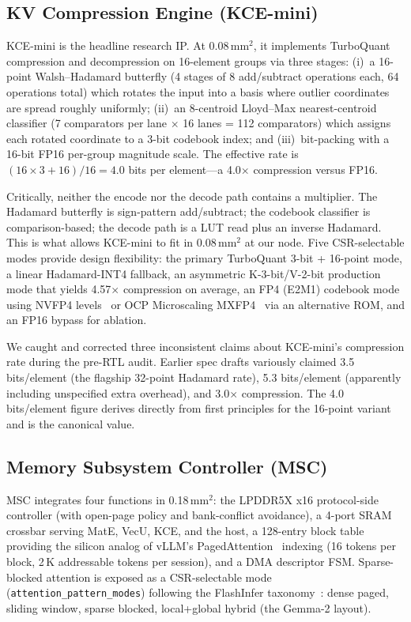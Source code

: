 \documentclass[conference]{IEEEtran}
\begin{document}
\subsection{KV Compression Engine (KCE-mini)}

KCE-mini is the headline research IP. At 0.08\,mm$^2$, it implements TurboQuant compression and decompression on 16-element groups via three stages: (i)\ a 16-point Walsh--Hadamard butterfly (4 stages of 8 add/subtract operations each, 64 operations total) which rotates the input into a basis where outlier coordinates are spread roughly uniformly; (ii)\ an 8-centroid Lloyd--Max nearest-centroid classifier (7 comparators per lane $\times$ 16 lanes = 112 comparators) which assigns each rotated coordinate to a 3-bit codebook index; and (iii)\ bit-packing with a 16-bit FP16 per-group magnitude scale. The effective rate is $(16 \times 3 + 16) / 16 = 4.0$ bits per element---a 4.0$\times$ compression versus FP16.

Critically, neither the encode nor the decode path contains a multiplier. The Hadamard butterfly is sign-pattern add/subtract; the codebook classifier is comparison-based; the decode path is a LUT read plus an inverse Hadamard. This is what allows KCE-mini to fit in 0.08\,mm$^2$ at our node. Five CSR-selectable modes provide design flexibility: the primary TurboQuant 3-bit + 16-point mode, a linear Hadamard-INT4 fallback, an asymmetric K-3-bit/V-2-bit production mode that yields 4.57$\times$ compression on average, an FP4 (E2M1) codebook mode using NVFP4 levels~\cite{nvfp4,nvidia_blackwell} or OCP Microscaling MXFP4~\cite{ocp_mx} via an alternative ROM, and an FP16 bypass for ablation.

We caught and corrected three inconsistent claims about KCE-mini's compression rate during the pre-RTL audit. Earlier spec drafts variously claimed 3.5 bits/element (the flagship 32-point Hadamard rate), 5.3 bits/element (apparently including unspecified extra overhead), and 3.0$\times$ compression. The 4.0 bits/element figure derives directly from first principles for the 16-point variant and is the canonical value.

\subsection{Memory Subsystem Controller (MSC)}

MSC integrates four functions in 0.18\,mm$^2$: the LPDDR5X x16 protocol-side controller (with open-page policy and bank-conflict avoidance), a 4-port SRAM crossbar serving MatE, VecU, KCE, and the host, a 128-entry block table providing the silicon analog of vLLM's PagedAttention~\cite{pagedattention} indexing (16 tokens per block, 2\,K addressable tokens per session), and a DMA descriptor FSM. Sparse-blocked attention is exposed as a CSR-selectable mode (\texttt{attention\_pattern\_modes}) following the FlashInfer taxonomy~\cite{flashinfer}: dense paged, sliding window, sparse blocked, local+global hybrid (the Gemma-2 layout).
\end{document}
